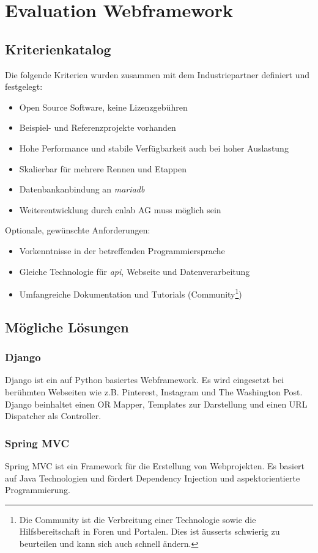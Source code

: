 \section{Evaluation Webframework}
\label{sec:evaluationwebframework}
\subsection{Kriterienkatalog}
Die folgende Kriterien wurden zusammen mit dem Industriepartner definiert und festgelegt:
\begin{itemize}
\item Open Source Software, keine Lizenzgebühren
\item Beispiel- und Referenzprojekte vorhanden
\item Hohe Performance und stabile Verfügbarkeit auch bei hoher Auslastung
\item Skalierbar für mehrere Rennen und Etappen
\item Datenbankanbindung an \textit{\gls{mariadb}}
\item Weiterentwicklung durch cnlab AG muss möglich sein
\end{itemize}
Optionale, gewünschte Anforderungen:
\begin{itemize}
\item Vorkenntnisse in der betreffenden Programmiersprache
\item Gleiche Technologie für \textit{\gls{api}}, Webseite und Datenverarbeitung
\item Umfangreiche Dokumentation und Tutorials (Community\footnote{Die Community ist die Verbreitung einer Technologie sowie die Hilfsbereitschaft in Foren und Portalen. Dies ist äusserts schwierig zu beurteilen und kann sich auch schnell ändern.})
\end{itemize}
\subsection{Mögliche Lösungen}
\subsubsection{Django}
Django ist ein auf Python basiertes Webframework. Es wird eingesetzt bei berühmten Webseiten wie z.B. Pinterest, Instagram und The Washington Post.  Django beinhaltet einen OR Mapper, Templates zur Darstellung und einen URL Dispatcher als Controller.
\subsubsection{Spring MVC}
Spring MVC ist ein Framework für die Erstellung von Webprojekten. Es basiert auf Java Technologien und fördert Dependency Injection  und aspektorientierte Programmierung.
